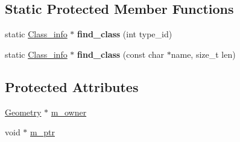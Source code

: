\subsection*{Static Protected Member Functions}
\begin{DoxyCompactItemize}
\item 
\mbox{\label{classGeometry_a8a4d21257b3f2eee5d4ec7addb78c2db}} 
static \mbox{\hyperlink{classGeometry_1_1Class__info}{Class\+\_\+info}} $\ast$ {\bfseries find\+\_\+class} (int type\+\_\+id)
\item 
\mbox{\label{classGeometry_a8f55127780f9a388386c6b76c19b06d4}} 
static \mbox{\hyperlink{classGeometry_1_1Class__info}{Class\+\_\+info}} $\ast$ {\bfseries find\+\_\+class} (const char $\ast$name, size\+\_\+t len)
\end{DoxyCompactItemize}
\subsection*{Protected Attributes}
\begin{DoxyCompactItemize}
\item 
\mbox{\hyperlink{classGeometry}{Geometry}} $\ast$ \mbox{\hyperlink{classGeometry_a8dad930f282cc91bce275f98ab13a691}{m\+\_\+owner}}
\item 
void $\ast$ \mbox{\hyperlink{classGeometry_a1d67d11bc1610ec1be958bacdcdca84c}{m\+\_\+ptr}}
\end{DoxyCompactItemize}
